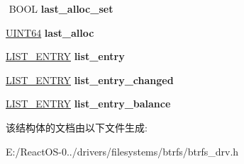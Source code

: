 \begin{DoxyCompactItemize}
$$\mbox{\label{structchunk_ae4079074761187a88b209cb5df9842b9}} 
B\+O\+OL {\bfseries last\+\_\+alloc\+\_\+set}
\item 
\mbox{\label{structchunk_a070a1c2aa8125d24973d9fb3d9cb06b3}} 
\hyperlink{_processor_bind_8h_a57be03562867144161c1bfee95ca8f7c}{U\+I\+N\+T64} {\bfseries last\+\_\+alloc}
\item 
\mbox{\label{structchunk_acaf04ef4ecc8c2e7c1fc1f12e6bfd24b}} 
\hyperlink{struct___l_i_s_t___e_n_t_r_y}{L\+I\+S\+T\+\_\+\+E\+N\+T\+RY} {\bfseries list\+\_\+entry}
\item 
\mbox{\label{structchunk_ac618699a116fcbfa8220bc7521c0484b}} 
\hyperlink{struct___l_i_s_t___e_n_t_r_y}{L\+I\+S\+T\+\_\+\+E\+N\+T\+RY} {\bfseries list\+\_\+entry\+\_\+changed}
\item 
\mbox{\label{structchunk_a60431e3dbdf14df5f4fc1f03718bba64}} 
\hyperlink{struct___l_i_s_t___e_n_t_r_y}{L\+I\+S\+T\+\_\+\+E\+N\+T\+RY} {\bfseries list\+\_\+entry\+\_\+balance}
\end{DoxyCompactItemize}


该结构体的文档由以下文件生成\+:\begin{DoxyCompactItemize}
\item 
E\+:/\+React\+O\+S-\/0../drivers/filesystems/btrfs/btrfs\+\_\+drv.\+h\end{DoxyCompactItemize}
